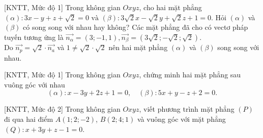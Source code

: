 \begin{bt}%
	[KNTT, Mức độ 1]%
	Trong không gian $Oxyz$, cho hai mặt phẳng		
	$(\alpha)\colon 3 x-y+z+\sqrt{2}=0 \text { và }(\beta)\colon 3 \sqrt{2} x-\sqrt{2} y+\sqrt{2} z+1=0.
	$		
	Hỏi $(\alpha)$ và  $(\beta)$ có song song với nhau hay không?
	\loigiai
	{			
		Các mặt phẳng đã cho có vectơ pháp tuyến tương ứng là $\overrightarrow{n_\alpha}=(3;-1,1), \overrightarrow{n_{\beta}}=(3\sqrt{2};-\sqrt{2};\sqrt{2})$.\\
		Do $\overrightarrow{n_p}=\sqrt{2}\cdot\overrightarrow{n_a}$ và $1\neq\sqrt{2}\cdot\sqrt{2}$ nên hai mặt phẳng $(\alpha)$ và $(\beta)$ song song với nhau.
	}
\end{bt}

\begin{bt}%
[KNTT, Mức độ 1]%
	Trong không gian $Oxyz$, chứng minh hai mặt phẳng sau vuông góc với nhau
	$$(\alpha)\colon x-3y+2z+1=0,\quad (\beta)\colon 5x+y-z+2=0.$$
\end{bt}

\begin{bt}%
[KNTT, Mức độ 2]%
	Trong không gian $Oxyz$, viết phương trình mặt phẳng $(P)$ đi qua hai điểm $A(1;2;-2)$, $B(2;4;1)$ và vuông góc với mặt phẳng $(Q)\colon x+3y+z-1=0$.
\end{bt}

